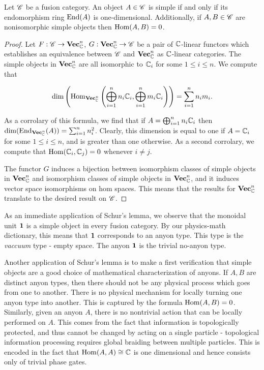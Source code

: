 \begin{proposition} Let $\mathscr{C}$ be a fusion category. An object $A\in \mathscr{C}$ is simple if and only if its endomorphism ring $\operatorname{End}(A)$ is one-dimensional. Additionally, if $A,B\in \mathscr{C}$ are nonisomorphic simple objects then $\operatorname{Hom}(A,B)=0$.
\end{proposition}
\begin{proof} Let $F:\mathscr{C}\to \mathbf{Vec}_{\mathbb{C}}^n$, $G:\mathbf{Vec}_{\mathbb{C}}^n\to \mathscr{C}$ be a pair of $\mathbb{C}$-linear functors which establishes an equivalence between $\mathscr{C}$ and $\mathbf{Vec}_{\mathbb{C}}^n$ as $\mathbb{C}$-linear categories. The simple objects in $\mathbf{Vec}_{\mathbb{C}}^n$ are all isomorphic to $\mathbb{C}_i$ for some $1\leq i \leq n$. We compute that

$$\dim\left(\operatorname{Hom}_{\mathbf{Vec}_{\mathbb{C}}^n}\left(\bigoplus_{i=1}^n n_i \mathbb{C}_i , \bigoplus_{i=1}^n m_i \mathbb{C}_i\right)\right)=\sum_{i=1}^n n_im_i.$$

As a corrolary of this formula, we find that if $A=\bigoplus_{i=1}^n n_i\mathbb{C}_i$ then $\dim(\operatorname{End}_{\mathbf{Vec}_{\mathbb{C}}^n}(A))=\sum_{i=1}^nn_i^2$. Clearly, this dimension is equal to one if $A=\mathbb{C}_i$ for some $1\leq i\leq n$, and is greater than one otherwise. As a second corrolary, we compute that $\operatorname{Hom}(\mathbb{C}_i,\mathbb{C}_j)=0$ whenever $i\neq j$.

The functor $G$ induces a bijection between isomorphism classes of simple objects in $\mathbf{Vec}_{\mathbb{C}}^n$ and isomorphism classes of simple objects in $\mathbf{Vec}_{\mathbb{C}}^n$, and it induces vector space isomorphisms on hom spaces. This means that the results for $\mathbf{Vec}_{\mathbb{C}}^n$ translate to the desired result on $\mathscr{C}$.
\end{proof}

As an immediate application of Schur's lemma, we observe that the monoidal unit $\mathbf{1}$ is a simple object in every fusion category. By our physics-math dictionary, this means that $\mathbf{1}$ corresponds to an anyon type. This type is the \textit{vaccuum} type - empty space. The anyon $\mathbf{1}$ is the trivial no-anyon type.

Another application of Schur's lemma is to make a first verification that simple objects are a good choice of mathematical characterization of anyons. If $A,B$ are distinct anyon types, then there should not be any physical process which goes from one to another. There is no physical mechanism for locally turning one anyon type into another. This is captured by the formula $\operatorname{Hom}(A,B)=0$. Similarly, given an anyon $A$, there is no nontrivial action that can be locally performed on $A$. This comes from the fact that information is topologically protected, and thus cannot be changed by acting on a single particle - topological information processing requires global braiding between multiple particles. This is encoded in the fact that $\operatorname{Hom}(A,A)\cong \mathbb{C}$ is one dimensional and hence consists only of trivial phase gates.

